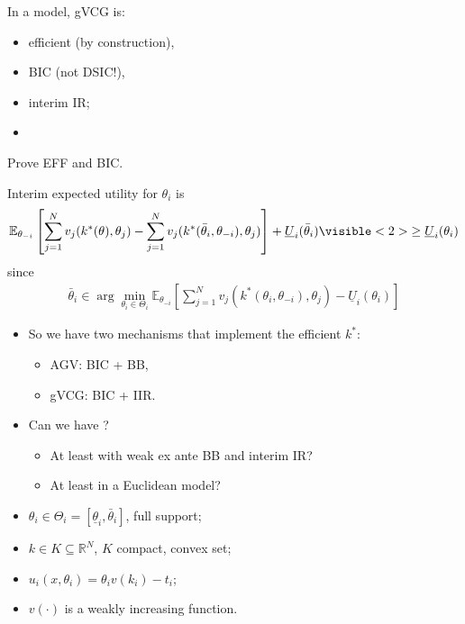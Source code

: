 \documentclass[english]{beamer}		%
\def\lyxframeend{} %
\begin{document}
\begin{theorem}
	In a  model, gVCG is:
	\begin{itemize}
		\item efficient (by construction),
		\item BIC (not DSIC!),
		\item interim IR;
		\item {}
	\end{itemize}
\end{theorem}
Prove EFF and BIC.
\lyxframeend


Interim expected utility for $\theta_i$ is
\begin{align*}
	\mathbb{E}_{\theta_{-i}} \left[ \sum_{j =1}^N v_j (k^*(\theta),\theta_j) - \sum_{j =1}^N v_j (k^*(\bar{\theta}_i,\theta_{-i}),\theta_j) \right] + \underline{U}_i (\bar{\theta}_i)
	\visible<2>{
		\geq \underline{U}_i(\theta_i)
	}
\end{align*}
\pause
since
\begin{align*}
	\bar{\theta}_i \in \arg \min_{\theta_i \in \Theta_i} \mathbb{E}_{\theta_{-i}} \left[ \sum_{j=1}^{N} v_j (k^*(\theta_i,\theta_{-i}),\theta_j) - \underline{U}_i (\theta_i) \right]
\end{align*}
\lyxframeend


\begin{itemize}
	\item So we have two mechanisms that implement the efficient $k^*$:
	\begin{itemize}
		\item AGV: BIC + BB,
		\item gVCG: BIC + IIR.
	\end{itemize}
	\pause
	\item Can we have ? 
	\begin{itemize}
		\item At least with weak ex ante BB and interim IR?
		\item At least in a \alert{Euclidean} model?
	\end{itemize}
\end{itemize}
\lyxframeend


\begin{itemize}
	\item $\theta_i \in \Theta_{i} = [\underline{\theta}_i, \bar{\theta}_i]$, full support;
	\item $k \in K \subseteq \mathbb{R}^N$, $K$ compact, convex set;
	\item $u_i(x,\theta_i) = \theta_i v(k_i) - t_i$;
	\item $v(\cdot)$ is a weakly increasing function.
\end{itemize}
\lyxframeend
\end{document}
